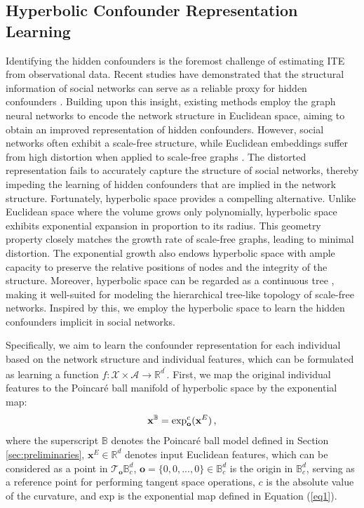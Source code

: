 \documentclass[twoside,leqno,twocolumn]{article}
\begin{document}
\subsection{Hyperbolic Confounder Representation Learning}
Identifying the hidden confounders is the foremost challenge of estimating ITE from observational data. 
Recent studies have demonstrated that the structural information of social networks can serve as a reliable proxy for hidden confounders \cite{guo2020learning,chu2021graph,guo2021ignite,ma2021deconfounding}. Building upon this insight, existing methods employ the graph neural networks to encode the network structure in Euclidean space, aiming to obtain an improved representation of hidden confounders. However, social networks often exhibit a scale-free structure, while Euclidean embeddings suffer from high distortion when applied to scale-free graphs \cite{chami2019hyperbolic,chen2022modeling}. The distorted representation fails to accurately capture the structure of social networks, thereby impeding the learning of hidden confounders that are implied in the network structure.
Fortunately, hyperbolic space provides a compelling alternative. Unlike Euclidean space where the volume grows only polynomially, hyperbolic space exhibits exponential expansion in proportion to its radius. This geometry property closely matches the growth rate of scale-free graphs, leading to minimal distortion. The exponential growth also endows hyperbolic space with ample capacity to preserve the relative positions of nodes and the integrity of the structure. Moreover, hyperbolic space can be regarded as a continuous tree \cite{yang2022hyperbolic}, making it well-suited for modeling the hierarchical tree-like topology of scale-free networks. Inspired by this, we employ the hyperbolic space to learn the hidden confounders implicit in social networks. 

Specifically, we aim to learn the confounder representation for each individual based on the network structure and individual features, which can be formulated as learning a function $f:\mathcal{X} \times \mathcal{A} \rightarrow \mathbb{R}^{d^\prime}$. 
First, we map the original individual features to the Poincar\'{e} ball manifold of hyperbolic space by the exponential map: 
\begin{equation}
\vspace{-0.2em}
\label{eq3}
    \mathbf{x}^\mathbb{B} = \exp_\mathbf{o}^c(\mathbf{x}^E) \,,
\end{equation}
where the superscript $\mathbb{B}$ denotes the Poincar\'{e} ball model defined in Section {\ref{sec:preliminaries}},
$\mathbf{x}^E \in \mathbb{R}^d$ denotes input Euclidean features, which can be considered as a point in $\mathcal{T}_\mathbf{o}\mathbb{B}^d_c$, $\mathbf{o}=\{0,0,...,0\} \in \mathbb{B}^d_c$ is the origin in $\mathbb{B}^d_c$, serving as a reference point for performing tangent space operations, $c$ is the absolute value of the curvature, and exp is the exponential map defined in Equation (\ref{eq1}).
\end{document}
